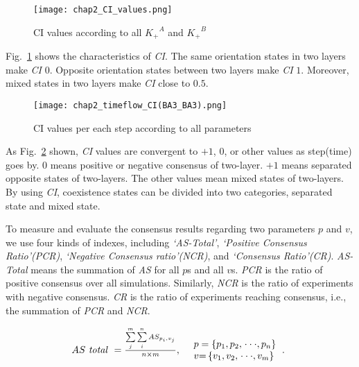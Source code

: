 \begin{figure}[!htb]
	\centering
	\texttt{[image: chap2\_CI\_values.png]}
	\caption{CI values according to all ${K_ + }^A$ and ${K_ + }^B$  }
	\label{chap2_CI_values}
\end{figure}

Fig.~\ref{chap2_CI_values} shows the characteristics of \textit{CI}. The same orientation states in two layers make \textit{CI} $0$. Opposite orientation states between two layers make \textit{CI} $1$. Moreover, mixed states in two layers make \textit{CI} close to $0.5$.

\begin{figure}[!htb]
	\centering
	\texttt{[image: chap2\_timeflow\_CI(BA3\_BA3).png]}
	\caption{CI values per each step according to all parameters}
	\label{chap2_timeflow_CI(BA3_BA3)}
\end{figure}

As Fig.~\ref{chap2_timeflow_CI(BA3_BA3)} shown, \textit{CI} values are convergent to $+1$, $0$, or other values as step(time) goes by. $0$ means positive or negative consensus of two-layer. $+1$ means separated opposite states of two-layers. The other values mean mixed states of two-layers. By using \textit{CI}, coexistence states can be divided into two categories, separated state and mixed state. 

To measure and evaluate the consensus results regarding two parameters $p$ and $v$, we use four kinds of indexes, including \textit{`AS-Total'}, \textit{`Positive Consensus Ratio'(PCR)}, \textit{`Negative Consensus ratio'(NCR)}, and \textit{`Consensus Ratio'(CR)}. \textit{AS-Total} means the summation of \textit{AS} for all $p$s and all $v$s. \textit{PCR} is the ratio of positive consensus over all simulations. Similarly, \textit{NCR} is the ratio of experiments with negative consensus. \textit{CR} is the ratio of experiments reaching consensus, i.e., the summation of \textit{PCR} and \textit{NCR}.

\begin{equation}
\begin{array}{cl}
AS\mbox{ \textit{total} } = \frac{{\sum\limits_j^m {\sum\limits_i^n {A{S_{{p _i},{v _j}}}} } }}{{n \times m }}, &
\begin{array}{l}
p  = \left\{ {{p _{\rm{1}}},{p _{\rm{2}}},\left. {\cdot\cdot\cdot,{p _n}} \right\}} \right.\\
v {\rm{ = }}\left\{ {{v _{\rm{1}}},{v _{\rm{2}}},\left. {\cdot\cdot\cdot,{v _m}} \right\}} \right.
\end{array}.\
\end{array}
\label{AS_total}
\end{equation}

